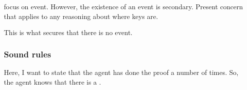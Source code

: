 \begin{note}
   focus on event.
  However, the existence of an event is secondary.
  Present concern that applies to any reasoning about where keys are.

  This is what secures that there is no event.
\end{note}

\subsubsection{Sound rules}

\begin{note}
  Here, I want to state that the agent has done the proof a number of times.
  So, the agent knows that there is a \pevent{}.
\end{note}

